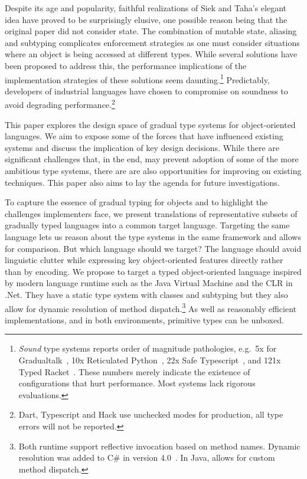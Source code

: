 \documentclass[acmlarge, anonymous, authordraft]{acmart}
\begin{document}
Despite its age and popularity, faithful realizations of Siek and Taha's
elegant idea have proved to be surprisingly elusive, one possible reason
being that the original paper did not consider state. The combination of
mutable state, aliasing and subtyping complicates enforcement strategies as
one must consider situations where an object is being accessed at different
types. While several solutions have been proposed to address this, the
performance implications of the implementation strategies of these solutions
seem daunting.\footnote{\emph{Sound} type systems reports order of magnitude
  pathologies, e.g.~5x for Gradualtalk~\cite{allende13}, 10x Reticulated
  Python~\cite{siek14}, 22x Safe Typescript~\cite{safe-typescript}, and 121x
  Typed Racket~\cite{popl16}. These numbers merely indicate the existence of
  configurations that hurt performance.  Most systems lack rigorous
  evaluations. } Predictably, developers of industrial languages have chosen
to compromise on soundness to avoid degrading performance.\footnote{Dart,
  Typescript and Hack use unchecked modes for production, all type errors
  will not be reported.}

This paper explores the design space of gradual type systems for object-oriented
languages. We aim to expose some of the forces that have influenced existing
systems and discuss the implication of key design decisions. While there are
significant challenges that, in the end, may prevent adoption of some of the
more ambitious type systems, there are are also opportunities for improving on
existing techniques.  This paper also aims to lay the agenda for future
investigations.

To capture the essence of gradual typing for objects and to highlight the
challenges implementers face, we present translations of representative subsets
of gradually typed languages into a common target language. Targeting the same
language lets us reason about the type systems in the same framework and allows
for comparison. But which language should we target? The language should avoid
linguistic clutter while expressing key object-oriented features directly rather
than by encoding. We propose to target a typed object-oriented language
inspired by modern language runtime such as the Java Virtual Machine and the
CLR in .Net. They have a static type system with classes and subtyping but they
also allow for dynamic resolution of method dispatch.\footnote{Both runtime
support reflective invocation based on method names. Dynamic resolution was
added to C\# in version 4.0~\cite{BAT14}. In Java,  allows for
custom method dispatch.} As well as reasonably efficient implementations, and in
both environments, primitive types can be unboxed.
\end{document}
